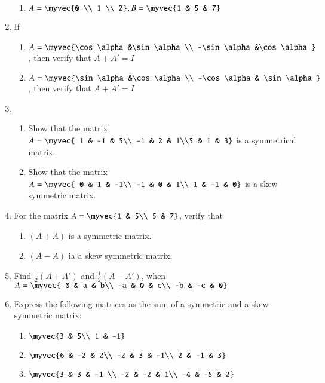 \documentclass{article}
\theoremstyle{remark}
\begin{document}
\begin{enumerate}
\begin{enumerate}[label=(\roman*)]
\item $A=\myvec {0  \\ 1 \\ 2} , B=\myvec {1 & 5 & 7}$
\end{enumerate}
\item If 
\begin{enumerate}[label=(\roman*)]
\item $A=\myvec {\cos \alpha &\sin \alpha \\ -\sin \alpha &\cos \alpha }$
, then verify that $A+A'=I$
\item $A=\myvec{\sin \alpha &\cos \alpha \\ -\cos  \alpha & \sin \alpha}$
, then verify that $A+A'=I$
\end{enumerate}
\item
\begin{enumerate}[label=(\roman*)]
\item Show that the matrix $A=\myvec{ 1 & -1 & 5\\ -1 & 2 & 1\\5 & 1 & 3} $ is a symmetrical matrix.
\item Show that the matrix $A=\myvec{ 0 &  1 & -1\\ -1 & 0 & 1\\ 1 & -1 & 0} $ is a skew symmetric matrix.
\end{enumerate} 
\item For the matrix $A=\myvec {1 & 5\\ 5 & 7}$, verify that
\begin{enumerate}[label=(\roman*)]
\item $(A+A)$ is a symmetric matrix.
\item $(A-A)$ ia a skew symmetric matrix.
\end{enumerate}
\item Find $\frac{1}{2} (A+A')$ and $\frac{1}{2} (A-A')$,
when $A=\myvec{ 0 & a & b\\ -a & 0 & c\\ -b & -c & 0}$
\item Express the following matrices as the sum of a symmetric and a skew symmetric matrix:
\begin{enumerate}[label=(\roman*)]
\item $\myvec{3 & 5\\ 1 & -1}$
\item $\myvec{6 & -2 & 2\\ -2 & 3 & -1\\ 2 & -1 & 3}$
\item $\myvec{3 & 3 & -1 \\ -2 & -2 & 1\\ -4 & -5 & 2}$

\end{enumerate}
\end{enumerate}
\end{document}
